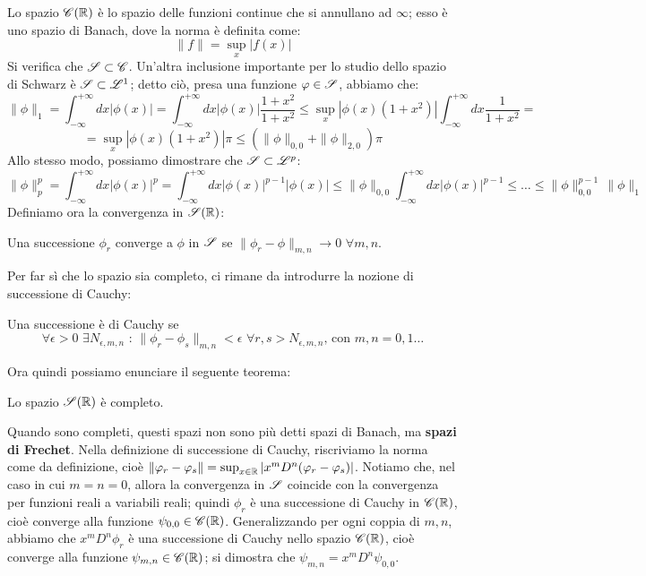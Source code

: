 Lo spazio $\cont(\R)$ è lo spazio delle funzioni continue che si annullano ad $\infty$; esso è uno spazio di Banach, dove la norma è definita come:
$$\|f\|= \sup_x |f(x)|$$
Si verifica che $\S \subset \cont$. Un'altra inclusione importante per lo studio dello spazio di Schwarz è $\S \subset \L^1$; detto ciò, presa una funzione $\phi \in \S$, abbiamo che:
$$\| \phi \|_1 = \int_{- \infty} ^{+\infty} dx | \phi (x) |= \int_{- \infty} ^{+\infty} dx | \phi (x) | \frac{1+x^2}{1+x^2} \leq \sup_x | \phi (x) (1+x^2)| \int_{- \infty} ^{+\infty} dx \frac{1}{1+x^2}=$$
$$=\sup_x | \phi (x) (1+x^2)| \pi  \leq \left( \| \phi \|_{0,0} + \| \phi \|_{2,0} \right) \pi$$
Allo stesso modo, possiamo dimostrare che $\S \subset \L^p$:
$$\| \phi \|_p ^p = \int_{- \infty} ^{+\infty} dx | \phi (x) |^p = \int_{- \infty} ^{+\infty} dx | \phi (x) |^{p-1} | \phi (x) | \leq \| \phi \|_{0,0} \int_{- \infty} ^{+\infty} dx | \phi (x) |^{p-1} \leq \dots \leq \| \phi \|_{0,0} ^{p-1} \, \| \phi \|_1$$
Definiamo ora la convergenza in $\S(\R)$:
\begin{definizione}
Una successione $\phi_r$ converge a $\phi$ in $\S$ se $\| \phi_r - \phi \|_{m,n} \to 0$ $\forall m,n$.
\end{definizione}
\clearpage
Per far sì che lo spazio sia completo, ci rimane da introdurre la nozione di successione di Cauchy:
\begin{definizione}
Una successione è di Cauchy se
$$\forall \epsilon >0 \, \, \exists N_{\epsilon , m,n} \text{ : }\|\phi_r -\phi_s \|_{m,n} < \epsilon \, \, \forall r,s > N_{\epsilon , m,n} \text{, con }m,n=0,1 \dots$$
\end{definizione}
Ora quindi possiamo enunciare il seguente teorema:
\begin{teorema}
Lo spazio $\S(\R)$ è completo.
\end{teorema}
Quando sono completi, questi spazi non sono più detti spazi di Banach, ma \textbf{spazi di Frechet}.
Nella definizione di successione di Cauchy, riscriviamo la norma come da definizione, cioè $\| \phi_r - \phi_s \| = \sup_{x \in \R} |x^m D^n (\phi_r - \phi_s)|$. Notiamo che, nel caso in cui $m=n=0$, allora la convergenza in $\S$ coincide con la convergenza per funzioni reali a variabili reali; quindi  $\phi_r$ è una successione di Cauchy in $\cont(\R)$, cioè converge alla funzione $\psi_{0,0} \in \cont(\R)$. Generalizzando per ogni coppia di $m,n$, abbiamo che $x^m D^n \phi_r$ è una successione di Cauchy nello spazio $\cont(\R)$, cioè converge alla funzione $\psi_{m,n} \in \cont(\R)$; si dimostra che $\psi_{m,n}=x^m D^n \psi_{0,0}$.
